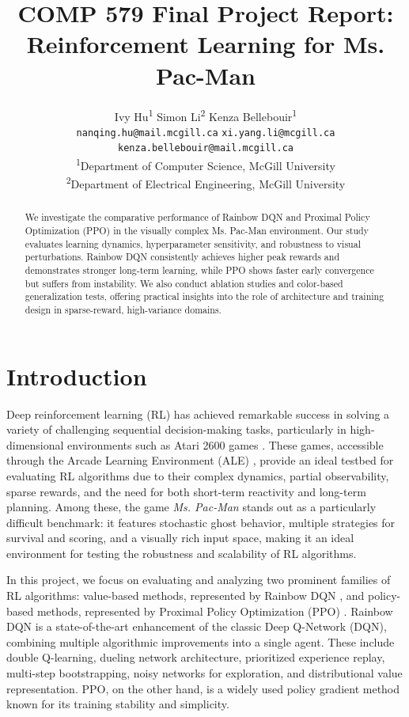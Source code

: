 \documentclass{article}
\title{COMP 579 Final Project Report: Reinforcement Learning for Ms. Pac-Man}
\author{
    Ivy Hu\textsuperscript{1} \quad
    Simon Li\textsuperscript{2} \quad
    Kenza Bellebouir\textsuperscript{1} \\
    \texttt{nanqing.hu@mail.mcgill.ca} \quad
    \texttt{xi.yang.li@mcgill.ca} \quad
    \texttt{kenza.bellebouir@mail.mcgill.ca} \\
    \textsuperscript{1}Department of Computer Science, McGill University \\
    \textsuperscript{2}Department of Electrical Engineering, McGill University
}
\begin{document}
\maketitle

\begin{abstract}
  We investigate the comparative performance of Rainbow DQN and Proximal Policy Optimization (PPO) in the visually complex Ms. Pac-Man environment. Our study evaluates learning dynamics, hyperparameter sensitivity, and robustness to visual perturbations. Rainbow DQN consistently achieves higher peak rewards and demonstrates stronger long-term learning, while PPO shows faster early convergence but suffers from instability. We also conduct ablation studies and color-based generalization tests, offering practical insights into the role of architecture and training design in sparse-reward, high-variance domains.
\end{abstract}

\section{Introduction}

Deep reinforcement learning (RL) has achieved remarkable success in solving a variety of challenging sequential decision-making tasks, particularly in high-dimensional environments such as Atari 2600 games \cite{mnih2015human}. These games, accessible through the Arcade Learning Environment (ALE) \cite{ale}, provide an ideal testbed for evaluating RL algorithms due to their complex dynamics, partial observability, sparse rewards, and the need for both short-term reactivity and long-term planning. Among these, the game \textit{Ms. Pac-Man} stands out as a particularly difficult benchmark: it features stochastic ghost behavior, multiple strategies for survival and scoring, and a visually rich input space, making it an ideal environment for testing the robustness and scalability of RL algorithms.

In this project, we focus on evaluating and analyzing two prominent families of RL algorithms: value-based methods, represented by Rainbow DQN \cite{hessel2018rainbow}, and policy-based methods, represented by Proximal Policy Optimization (PPO) \cite{schulman2017proximal}. Rainbow DQN is a state-of-the-art enhancement of the classic Deep Q-Network (DQN), combining multiple algorithmic improvements into a single agent. These include double Q-learning, dueling network architecture, prioritized experience replay, multi-step bootstrapping, noisy networks for exploration, and distributional value representation. PPO, on the other hand, is a widely used policy gradient method known for its training stability and simplicity.
\end{document}
